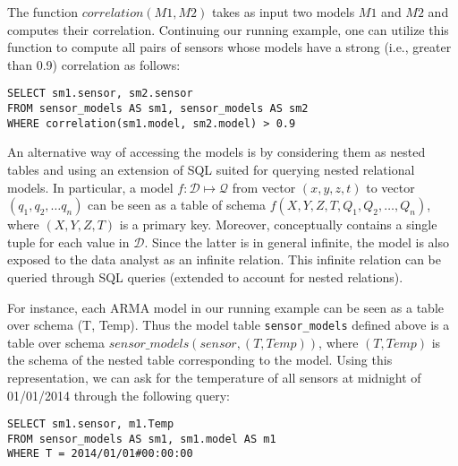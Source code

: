 \vspace*{0.5cm}
\begin{example}
The function $correlation(M1, M2)$ takes as input two models $M1$ and $M2$ and computes their correlation. Continuing our running example, one can utilize this function to compute all pairs of sensors whose models have a strong (i.e., greater than 0.9) correlation as follows:
\begin{verbatim}
SELECT sm1.sensor, sm2.sensor
FROM sensor_models AS sm1, sensor_models AS sm2
WHERE correlation(sm1.model, sm2.model) > 0.9 
\end{verbatim}
\end{example}
\vspace*{0.5cm}

 An alternative way of accessing the models is by considering them as nested tables and using an extension of SQL suited for querying nested relational models. In particular, a model $f: \mathcal{D} \mapsto \mathcal{Q}$ from vector $(x, y, z, t)$ to vector $(q_1, q_2, \ldots q_n)$ can be seen as a table of schema $f(X, Y, Z, T, Q_1, Q_2, \ldots, Q_n)$, where $(X, Y, Z, T)$ is a primary key. Moreover, conceptually contains a single tuple for each value in $\mathcal{D}$.  Since the latter is in general infinite, the model is also exposed to the data analyst as an infinite relation. This infinite relation can be queried through SQL queries (extended to account for nested relations).

\vspace*{0.5cm}
\begin{example}
For instance, each ARMA model in our running example can be seen as a table over schema (T, Temp). Thus the model table \texttt{sensor\_models} defined above is a table over schema $sensor\_models(sensor, (T, Temp))$, where $(T, Temp)$ is the schema of the nested table corresponding to the model. Using this representation, we can ask for the temperature of all sensors at midnight of 01/01/2014 through the following query:

\begin{verbatim}
SELECT sm1.sensor, m1.Temp
FROM sensor_models AS sm1, sm1.model AS m1
WHERE T = 2014/01/01#00:00:00
\end{verbatim}
\end{example}
\vspace*{0.5cm}


